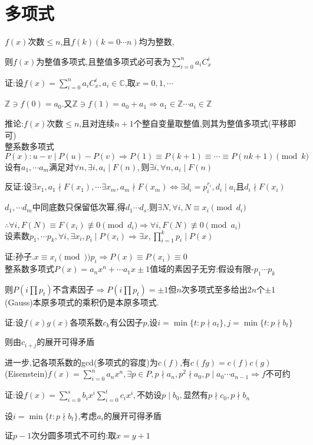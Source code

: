 \section{多项式}
$ f(x)$次数$ \le n$,且$ f(k)(k=0\cdots n)$均为整数,

则$ f(x)$为整值多项式,且整值多项式必可表为$ \sum_{i=0}^{n}{a_iC_x^i}$

证:设$ f(x)=\sum_{i=0}^{n}{a_iC_x^i},a_i \in \mathbb{C}$,取$ x=0,1,\cdots$

$ \mathbb{Z}\ni f(0)=a_0$.又$ \mathbb{Z}\ni f(1)=a_0+a_1\Rightarrow a_1\in \mathbb{Z}\cdots a_i\in \mathbb{Z}$

推论:$ f(x)$次数$ \le n$,且对连续$ n+1$个整自变量取整值,则其为整值多项式(平移即可)
\\

整系数多项式$ P(x):u-v \mid P(u)-P(v)\Rightarrow P(1)\equiv P(k+1) \equiv \cdots \equiv P(nk+1) \pmod k$
\\

设有$ a_1,\cdots a_m$满足对$ \forall n,\exists i,a_i\mid F(n),$则$ \exists i,\forall n,a_i\mid F(n)$

反证:设$ \exists x_1, a_1 \nmid F(x_1),\cdots \exists x_m, a_m \nmid F(x_m)
\Leftrightarrow \exists d_i=p_i^{r_i},d_i \mid a_i$且$ d_i\nmid F(x_i)$

$ d_1,\cdots d_m$中同底数只保留低次幂,得$ d_1\cdots d_s.$则$ \exists N ,\forall i,N\equiv x_i \pmod{d_i}$

$ \therefore \forall i,F(N)\equiv F(x_i)\not\equiv 0 \pmod{d_i}\Rightarrow \forall i,F(N)\not\equiv 0 \pmod{a_i}$
\\

设素数$ p_1,\cdots p_k,\forall i ,\exists x_i,p_i \mid P(x_i)\Rightarrow \exists x ,\prod_{i=1}^{k}{p_i}\mid P(x)$

证:孙子.$ x\equiv x_i \pmod)p_i\Rightarrow P(x)\equiv P(x_i)\equiv 0$
\\

整系数多项式$ P(x)=a_nx^n+\cdots a_1x\pm1$值域的素因子无穷:假设有限-$ p_1\cdots p_k$

则$ P(i\prod{p_t})$不含素因子$ \Rightarrow P(i\prod{p_t})=\pm 1$但$ n$次多项式至多给出$ 2n$个$ \pm 1$
\\

(Gauss)本原多项式的乘积仍是本原多项式.

证:设$ f(x)g(x)$各项系数$ c_k$有公因子$ p$,设$ i=\min\{t: p \nmid a_t\},j=\min\{t: p\nmid b_t\}$

则由$ c_{i+j}$的展开可得矛盾

进一步,记各项系数的gcd(多项式的容度)为$ c(f)$,有$ c(fg)=c(f)c(g)$
\\

(Eisenstein)$ f(x)=\sum_{i=0}^{n}{a_nx^n},\exists p\in P,p \nmid a_n,p^2\nmid a_0,p \mid a_0\cdots a_{n-1}\Rightarrow f$不可约

证:设$ f(x)=\sum_{i=0}^{s}{b_ix^i}\sum_{i=0}^{t}{c_ix^i},$不妨设$ p \mid b_0,$显然有$ p\nmid c_0,p\nmid b_n$

设$ i=\min\{ t:p\nmid b_t\}$,考虑$ a_i$的展开可得矛盾

证$ p-1$次分圆多项式不可约:取$ x=y+1$
